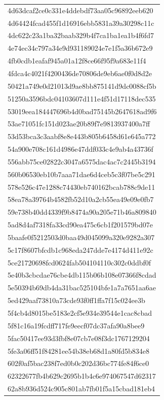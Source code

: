 \begin{tabular}{l}
4d63dcaf2ce0c331e4ddebdf73aa05c96892eeb620 \\
4d64424fcad455f1d16916ebb5831a39a30298c11c \\
4dc622c23a1ba32baab329b4f7ca1ba1ea1b4f6fd7 \\
4e74ec34c797a34e9d931189024e7e1f5a36b672e9 \\
4fb0cdb1eafaf945a01a12f8ce66f95f9a683e11f4 \\
4fdca4c4021f4200436de70806de9eb6ae0f0d8d2e \\
50421a749e0d21013d9ae8bb875141d9dc0088cf5b \\
51250a3596bdc04103607d111e4f51d17118dec535 \\
53019eea184447696b4d0bad75145b2647618ad9f6 \\
53ae71051fc151d023ae20b89f7e9813937400a7ff \\
53d53bca3c3aabf8e8e443b805b6458d61e645a772 \\
54a900e708c161d4986e47ddf033c4e9ab4a43736f \\
556abb75ce02822c3047a6575dac4ac7c2445b3194 \\
560b06530eb10b7aaa71dae6d4ceb5c3f07be5c291 \\
578e526c47e1288c74430eb740162bcab788c9de11 \\
58ea78a39764b4582fb52d10a2cb55ea49e09e0fb7 \\
59e738b40dd4339f9b8474a90a205e71b46a809840 \\
5ad8d4af7318fa33cd90ea475c6cb1f201579bd07e \\
5baafe0f5212503d0baa49d045099a320e9282a307 \\
5c17f8607bfcdb1c968eda247dde7e4174d411e92c \\
5ce21720698fcd0624fab504104110c302c0ddbf0f \\
5e40b3cbcdae76cbe4db115b06b108e07366f8cdad \\
5e50394b69db4da31bac525104bfe1a7a7651aa6ae \\
5ed429aaf73810a73cde93f0ff1ffa7f15c024ee3b \\
5f4cb4d8015be5183e2cf5e934e39544e1cac8cbad \\
5f81c16a19fcdff717fe9eecf07dc37afa90a8bee9 \\
5fac50417ee93d3fbf8e07cb7e08f3dc1767129204 \\
5fe3a06ff51f84281ee54b38eb68d1a80fd5b834e8 \\
602f0af5bac238f7ed0b0c202d36bc774fe84f6ce0 \\
62322677fb4b629c2695b1b4c6e974067547d62317 \\
62a8b936d524c905c801ab7fb01f5a15cbad181eb4 \\

\end{tabular}
